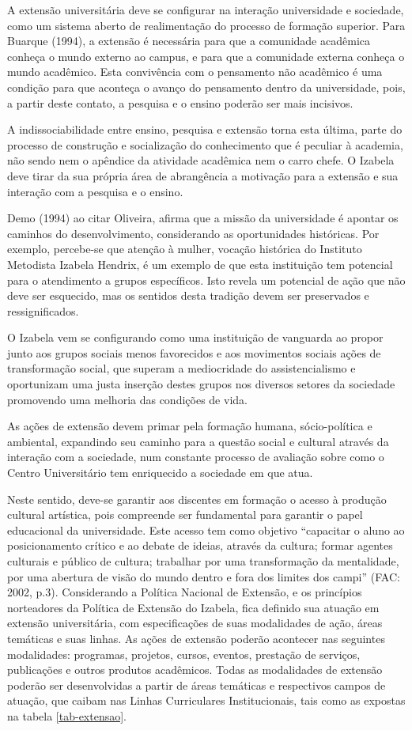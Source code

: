 \documentclass[a4paper, 12pt, openright, oneside, german, french, english, brazil]{abntex2}
\begin{document}
A extensão universitária deve se configurar na interação universidade e sociedade, como um sistema aberto de realimentação do processo de formação superior. Para Buarque (1994), a extensão é necessária para que a comunidade acadêmica conheça o mundo externo ao campus, e para que a comunidade externa conheça o mundo acadêmico. Esta convivência com o pensamento não acadêmico é uma condição para que aconteça o avanço do pensamento dentro da universidade, pois, a partir deste contato, a pesquisa e o ensino poderão ser mais incisivos.

A indissociabilidade entre ensino, pesquisa e extensão torna esta última, parte do processo de construção e socialização do conhecimento que é peculiar à academia, não sendo nem o apêndice da atividade acadêmica nem o carro chefe. O Izabela deve tirar da sua própria área de abrangência a motivação para a extensão e sua interação com a pesquisa e o ensino.

Demo (1994) ao citar Oliveira, afirma que a missão da universidade é apontar os caminhos do desenvolvimento, considerando as oportunidades históricas. Por exemplo, percebe-se que atenção à mulher, vocação histórica do Instituto Metodista Izabela Hendrix, é um exemplo de que esta instituição tem potencial para o atendimento a grupos específicos. Isto revela um potencial de ação que não deve ser esquecido, mas os sentidos desta tradição devem ser preservados e ressignificados.

O Izabela vem se configurando como uma instituição de vanguarda ao propor junto aos grupos sociais menos favorecidos e aos movimentos sociais ações de transformação social, que superam a mediocridade do assistencialismo e oportunizam uma justa inserção destes grupos nos diversos setores da sociedade promovendo uma melhoria das condições de vida.

As ações de extensão devem primar pela formação humana, sócio-política e ambiental, expandindo seu caminho para a questão social e cultural através da interação com a sociedade, num constante processo de avaliação sobre como o Centro Universitário tem enriquecido a sociedade em que atua.

Neste sentido, deve-se garantir aos discentes em formação o acesso à produção cultural artística, pois compreende ser fundamental para garantir o papel educacional da universidade. Este acesso tem como objetivo “capacitar o aluno ao posicionamento crítico e ao debate de ideias, através da cultura; formar agentes culturais e público de cultura; trabalhar por uma transformação da mentalidade, por uma abertura de visão do mundo dentro e fora dos limites dos campi” (FAC: 2002, p.3). Considerando a Política Nacional de Extensão, e os princípios norteadores da Política de Extensão do Izabela, fica definido sua atuação em extensão universitária, com especificações de suas modalidades de ação, áreas temáticas e suas linhas. As ações de extensão poderão acontecer nas seguintes modalidades: programas, projetos, cursos, eventos, prestação de serviços, publicações e outros produtos acadêmicos. Todas as modalidades de extensão poderão ser desenvolvidas a partir de áreas temáticas e respectivos campos de atuação, que caibam nas Linhas Curriculares Institucionais, tais como as expostas na tabela \ref{tab-extensao}.
\end{document}
